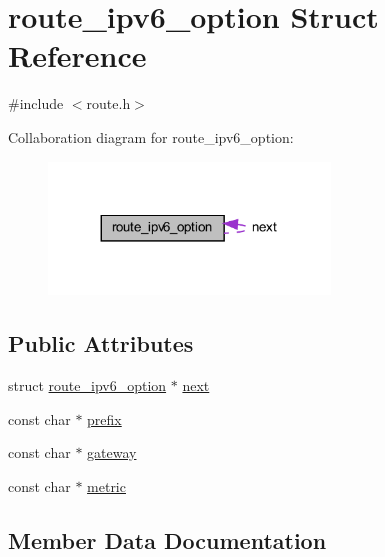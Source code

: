 \hypertarget{structroute__ipv6__option}{}\section{route\+\_\+ipv6\+\_\+option Struct Reference}
\label{structroute__ipv6__option}


{\ttfamily \#include $<$route.\+h$>$}



Collaboration diagram for route\+\_\+ipv6\+\_\+option\+:
\nopagebreak
\begin{figure}[H]
\begin{center}
\leavevmode
\includegraphics[width=212pt]{structroute__ipv6__option__coll__graph}
\end{center}
\end{figure}
\subsection*{Public Attributes}
\begin{DoxyCompactItemize}
\item 
struct \hyperlink{structroute__ipv6__option}{route\+\_\+ipv6\+\_\+option} $\ast$ \hyperlink{structroute__ipv6__option_a7ba8628e0b3c6d57eda197c9148b8023}{next}
\item 
const char $\ast$ \hyperlink{structroute__ipv6__option_ab79c4b88ea837357d62414c63e648965}{prefix}
\item 
const char $\ast$ \hyperlink{structroute__ipv6__option_a87609a4d4046b809cb09a9589ad89342}{gateway}
\item 
const char $\ast$ \hyperlink{structroute__ipv6__option_aafdd5f0107a4d79ce2117cea8b7aa25b}{metric}
\end{DoxyCompactItemize}


\subsection{Member Data Documentation}
\hypertarget{structroute__ipv6__option_a87609a4d4046b809cb09a9589ad89342}{}
